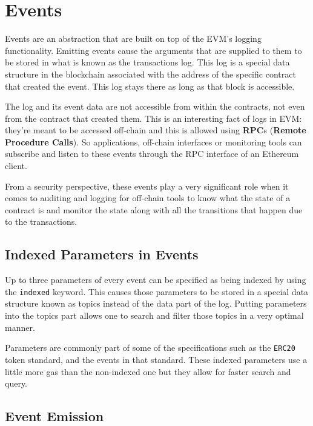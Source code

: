 \section{Events}\label{events}

Events are an abstraction that are built on top of the EVM's logging
functionality. Emitting events cause the arguments that are supplied to
them to be stored in what is known as the transactions log. This log is
a special data structure in the blockchain associated with the address
of the specific contract that created the event. This log stays there as
long as that block is accessible.

The log and its event data are not accessible from within the contracts,
not even from the contract that created them. This is an interesting
fact of logs in EVM: they're meant to be accessed off-chain and this is
allowed using \textbf{RPC}s (\textbf{Remote Procedure Calls}). So
applications, off-chain interfaces or monitoring tools can subscribe and
listen to these events through the RPC interface of an Ethereum client.

From a security perspective, these events play a very significant role
when it comes to auditing and logging for off-chain tools to know what
the state of a contract is and monitor the state along with all the
transitions that happen due to the transactions.

\subsection{Indexed Parameters in
Events}\label{indexed-parameters-in-events}

Up to three parameters of every event can be specified as being indexed
by using the \texttt{indexed} keyword. This causes those parameters to
be stored in a special data structure known as topics instead of the
data part of the log. Putting parameters into the topics part allows one
to search and filter those topics in a very optimal manner.

Parameters are commonly part of some of the specifications such as the
\texttt{ERC20} token standard, and the events in that standard. These
indexed parameters use a little more gas than the non-indexed one but
they allow for faster search and query.

\subsection{Event Emission}\label{event-emission}

